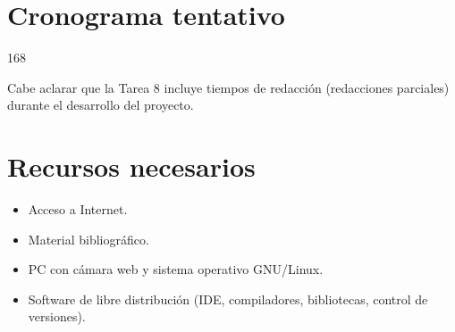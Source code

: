 \documentclass[a4paper,11pt,spanish]{article}
\begin{document}
\section{Cronograma tentativo}
\begin{gantt}[xunitlength=1.5cm,fontsize=\small,titlefontsize=\small,drawledgerline=true]{16}{8}
   \begin{ganttitle}
    \end{ganttitle}
    
    \begin{ganttitle}
    \end{ganttitle}
        


    

	
\end{gantt}

Cabe aclarar que la Tarea 8 incluye tiempos de redacción (redacciones parciales) durante el desarrollo del proyecto.

\section{Recursos necesarios}

\begin{itemize}
	\item Acceso a Internet.
	\item Material bibliográfico.
	\item PC con cámara web y sistema operativo GNU/Linux.
	\item Software de libre distribución (IDE, compiladores, bibliotecas, control de versiones).
\end{itemize}
\end{document}
